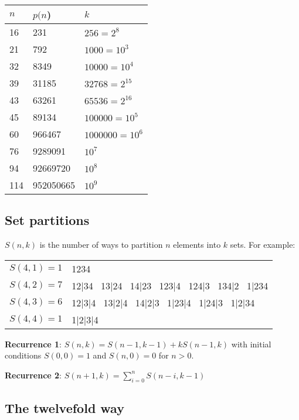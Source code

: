 \documentclass[a4paper,11pt]{article}
\begin{document}
\begin{tabular}{|l|l|l|}
\hline
	$n$ & $p(n$) & $k$ \\
\hline
	16 & 231 & $256=2^8$ \\
	21 & 792 & $1000=10^3$ \\
	32 & 8349 & $10000=10^4$ \\
	39 & 31185 & $32768=2^{15}$ \\
	43 & 63261 & $65536=2^{16}$ \\
	45 & 89134 & $100000=10^5$ \\
	60 & 966467 & $1000000=10^6$ \\
	76 & 9289091 & $10^7$ \\
	94 & 92669720 & $10^8$ \\
	114 & 952050665 & $10^9$ \\
\hline
\end{tabular}

\subsection{Set partitions}

$S(n,k)$ is the number of ways to partition $n$ elements into $k$ sets. For example:

\begin{tabular}{|l|l|}
\hline
	$S(4,1)=1$ & 1234  \\
	$S(4,2)=7$ & 12|34 \, 13|24 \, 14|23 \, 123|4 \, 124|3 \, 134|2 \, 1|234 \\
	$S(4,3)=6$ & 12|3|4 \, 13|2|4 \, 14|2|3 \, 1|23|4 \, 1|24|3 \, 1|2|34 \\
	$S(4,4)=1$ & 1|2|3|4  \\
\hline
\end{tabular}

{\bf Recurrence 1}: $S(n,k)=S(n-1,k-1)+kS(n-1,k)$ with initial conditions $S(0,0)=1$ and $S(n,0)=0$ for $n>0$.

{\bf Recurrence 2}: $S(n+1,k)=\sum_{i=0}^n S(n-i,k-1)$

\subsection{The twelvefold way}
\end{document}
